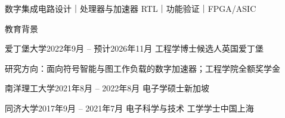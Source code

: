 \documentclass{resume}
\begin{document}
\begin{center}
  数字集成电路设计｜处理器与加速器 RTL｜功能验证｜FPGA/ASIC
\end{center}

\begin{rSection}{教育背景}
  \begin{rSubsection}{爱丁堡大学}{2022年9月 -- 预计2026年11月}
    {工程学博士候选人}{英国爱丁堡}
    \item 研究方向：面向符号智能与图工作负载的数字加速器；工程学院全额奖学金
  \end{rSubsection}
  \begin{rSubsectionNoItems}{南洋理工大学}{2021年8月 -- 2022年8月}
    {电子学硕士}{新加坡}
  \end{rSubsectionNoItems}
  \begin{rSubsectionNoItems}{同济大学}{2017年9月 -- 2021年7月}
    {电子科学与技术 工学学士}{中国上海}
  \end{rSubsectionNoItems}
\end{rSection}
\end{document}
